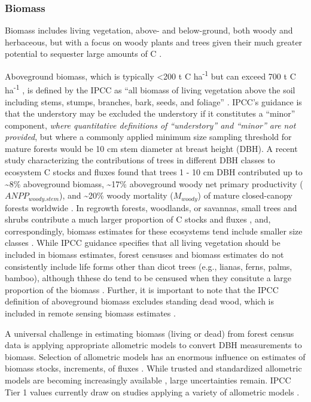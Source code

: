 \documentclass[, manuscript]{copernicus}
\begin{document}
\subsubsection{Biomass}

Biomass includes living vegetation, above- and below-ground, both woody
and herbaceous, but with a focus on woody plants and trees given their
much greater potential to sequester large amounts of C
\citep{ipcc_2006_2006}.

Aboveground biomass, which is typically \textless200 t C
ha\textsuperscript{-1} but can exceed 700 t C ha\textsuperscript{-1}
\citep{anderson-teixeira_carbon_2021}, is defined by the IPCC as ``all
biomass of living vegetation above the soil including stems, stumps,
branches, bark, seeds, and foliage''
\citep{ipcc_good_2003, ipcc_2006_2006}. IPCC's guidance is that the
understory may be excluded the understory if it constitutes a ``minor''
component, \emph{where quantitative definitions of ``understory'' and
``minor'' are not provided}, but where a commonly applied minimum size
sampling threshold for mature forests would be 10 cm stem diameter at
breast height (DBH). A recent study characterizing the contributions of
trees in different DBH classes to ecosystem C stocks and fluxes found
that trees 1 - 10 cm DBH contributed up to \textasciitilde8\%
aboveground biomass, \textasciitilde17\% aboveground woody net primary
productivity (\(ANPP_{woody.stem}\)), and \textasciitilde20\% woody
mortality (\(M_{woody}\)) of mature closed-canopy forests worldwide
\citep{piponiot_distribution_2022}. In regrowth forests, woodlands, or
savannas, small trees and shrubs contribute a much larger proportion of
C stocks and fluxes \citep{piponiot_distribution_2022, refs_from_ForC},
and, correspondingly, biomass estimates for these ecosystems tend
include smaller size classes \citep[e.g.,][]{refs_from_ForC}. While IPCC
guidance specifies that all living vegetation should be included in
biomass estimates, forest censuses and biomass estimates do not
consistently include life forms other than dicot trees (e.g., lianas,
ferns, palms, bamboo), although thhese do tend to be censused when they
consitute a large proportion of the biomass \citep{refs_from_ForC}.
Further, it is important to note that the IPCC definition of aboveground
biomass excludes standing dead wood, which is included in remote sensing
biomass estimates \citep{duncanson_aboveground_2021}.

A universal challenge in estimating biomass (living or dead) from forest
census data is applying appropriate allometric models to convert DBH
measurements to biomass. Selection of allometric models has an enormous
influence on estimates of biomass stocks, increments, of fluxes
\citep{clark_landscapescale_2000, clark_net_2001}. While trusted and
standardized allometric models are becoming increasingly available
\citep{chave_improved_2014, rejou-mechain_biomass_2017, gonzalez-akre_allodb_2022},
large uncertainties remain. IPCC Tier 1 values currently draw on studies
applying a variety of allometric models
\citep[e.g.,][]{requenasuarez_estimating_2019, rozendaal_aboveground_2022}.
\end{document}
